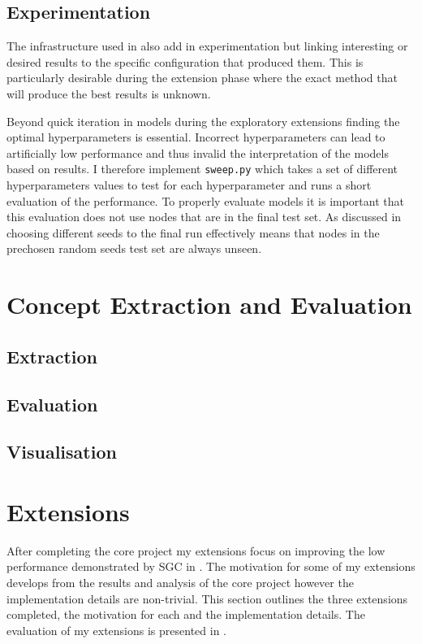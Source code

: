 \subsection{Experimentation}
The infrastructure used in  also add in experimentation but linking interesting or desired results to the specific configuration that produced them.
This is particularly desirable during the extension phase where the exact method that will produce the best results is unknown.

Beyond quick iteration in models during the exploratory extensions finding the optimal hyperparameters is essential.
Incorrect hyperparameters can lead to artificially low performance and thus invalid the interpretation of the models based on results.
I therefore implement \texttt{sweep.py} which takes a set of different hyperparameters values to test for each hyperparameter and runs a short evaluation of the performance.
To properly evaluate models it is important that this evaluation does not use nodes that are in the final test set.
As discussed in  choosing different seeds to the final run effectively means that nodes in the prechosen random seeds test set are always unseen.

\section{Concept Extraction and Evaluation}

\subsection{Extraction}
\label{sec:extraction}

\subsection{Evaluation}
\label{sec:concept-eval}

\subsection{Visualisation}
\label{sec:vis}

\section{Extensions}
After completing the core project my extensions focus on improving the low performance demonstrated by SGC in .
The motivation for some of my extensions develops from the results and analysis of the core project however the implementation details are non-trivial.
This section outlines the three extensions completed, the motivation for each and the implementation details.
The evaluation of my extensions is presented in .

